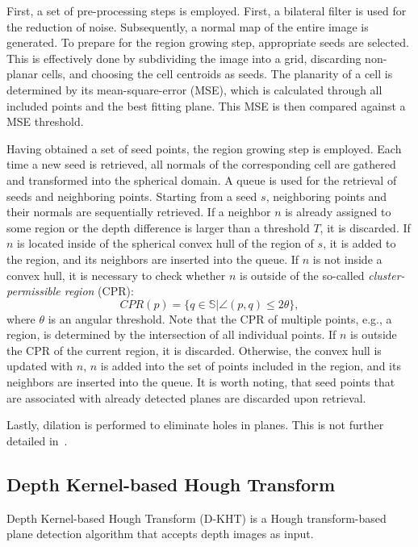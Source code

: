 \documentclass[main.tex]{subfiles}
\begin{document}
First, a set of pre-processing steps is employed.
First, a bilateral filter is used for the reduction of noise. Subsequently, a normal map of the entire image
is generated.
To prepare for the region growing step, appropriate seeds are selected. This is effectively done by subdividing the
image into a grid, discarding non-planar cells, and choosing the cell centroids as seeds.
The planarity of a cell is determined by its mean-square-error (MSE), which is calculated through all included
points and the best fitting plane. This MSE is then compared against a MSE threshold.

Having obtained a set of seed points, the region growing step is employed.
Each time a new seed is retrieved, all normals of the corresponding cell are gathered and transformed
into the spherical domain. A queue is used for the retrieval of seeds and neighboring points.
Starting from a seed $s$, neighboring points and their normals are sequentially retrieved.
If a neighbor $n$ is already assigned to some region or the depth difference is larger than a threshold $T$, it is
discarded. If $n$ is located inside of the spherical convex hull of the region of $s$,
it is added to the region, and its neighbors are inserted into the queue. If $n$ is not inside a
convex hull, it is necessary to check whether $n$ is outside of the so-called \textit{cluster-permissible region} (CPR):
\begin{equation}
    CPR(p) = \{q \in \mathbb{S} | \angle(p,q)\leq 2\theta\},
\end{equation}
where $\theta$ is an angular threshold. Note that the CPR of multiple points, e.g., a region, is determined by
the intersection of all individual points.
If $n$ is outside the CPR of the current region, it is discarded. Otherwise, the convex hull is updated with $n$,
$n$ is added into the set of points included in the region, and its neighbors are inserted into the queue.
It is worth noting, that seed points that are associated with already detected planes are discarded upon retrieval.

Lastly, dilation is performed to eliminate holes in planes. This is not further detailed in~\cite[Section~III.B]{Mols_Li_Hanebeck_2020}.


\subsection{Depth Kernel-based Hough Transform}
\label{subsec:bg-dkht}
Depth Kernel-based Hough Transform (D-KHT) \cite{Vera_Lucio_Fernandes_Velho_2018} is a Hough transform-based plane detection
algorithm that accepts depth images as input.
\end{document}
